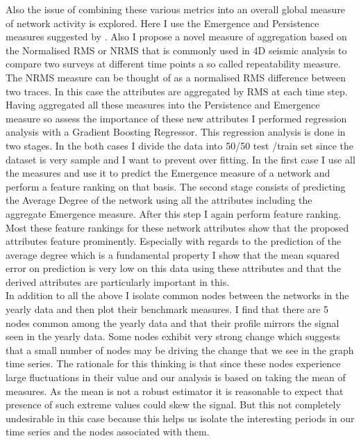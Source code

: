 Also the issue of combining these various metrics into an overall global measure of network activity is explored. Here I use the Emergence and Persistence measures suggested by \citeauthor{Wei2015}\cite{Wei2015}. Also I propose a novel measure of aggregation based on the Normalised RMS or NRMS that is commonly used in 4D seismic analysis to compare two surveys at different time points a so called repeatability measure. The NRMS measure can be thought of as a normalised RMS difference between two traces. In this case the attributes are aggregated by RMS at each time step. \\

Having aggregated all these measures into the Persistence and Emergence measure so assess the importance of these new attributes I performed regression analysis with a Gradient Boosting Regressor. This regression analysis is done in two stages. In the both cases I divide the data into 50/50 test /train set since the dataset is very sample and I want to prevent over fitting. In the first case I use all the measures and use it to predict the Emergence measure of a network and perform a feature ranking on that basis. The second stage consists of predicting the Average Degree of the network using all the attributes including the aggregate Emergence measure. After this step I again perform feature ranking. Most these feature rankings for these network attributes show that the proposed attributes feature prominently. Especially with regards to the prediction of the average degree which is a fundamental property I show that the mean squared error on prediction is very low on this data using these attributes and that the derived attributes are particularly important in this. \\

In addition to all the above I isolate common nodes between the networks in the yearly data and then plot their benchmark measures. I find that there are 5 nodes common among the yearly data and that their profile mirrors the signal seen in the yearly data. Some nodes exhibit very strong change which suggests that a small number of nodes may be driving the change that we see in the graph time series. The rationale for this thinking is that since these nodes experience large fluctuations in their value and our analysis is based on taking the mean of measures. As the mean is not a robust estimator it is reasonable to expect that presence of such extreme values could skew the signal. But this not completely undesirable in this case because this helps us isolate the interesting periods in our time series and the nodes associated with them. \\


